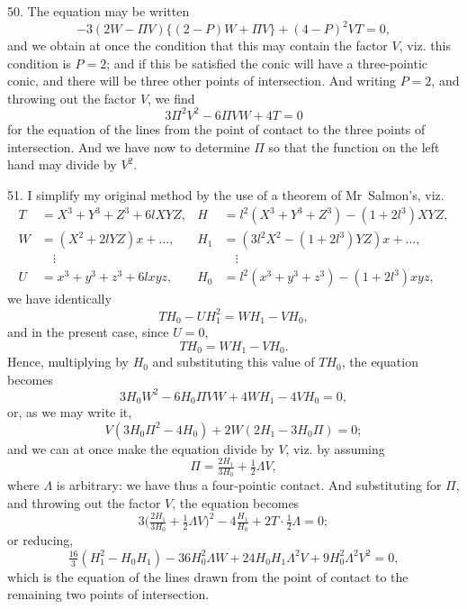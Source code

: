 \documentclass[11pt,a4paper]{article}
\theoremstyle{definition}
\begin{document}
50. The equation may be written
\[
-3(2W-\Pi V)\{(2-P)W+\Pi V\}+(4-P)^2VT=0,
\]
and we obtain at once the condition that this may contain the factor $V$, viz. this condition is $P=2$; and if this be satisfied the conic will have a three-pointic conic, and there will be three other points of intersection. And writing $P=2$, and throwing out the factor $V$, we find
\[
3\Pi^2V^2-6\Pi VW+4T=0
\]
for the equation of the lines from the point of contact to the three points of intersection. And we have now to determine $\Pi$ so that the function on the left hand may divide by $V^2$.

51. I simplify my original method by the use of a theorem of Mr~Salmon's, viz.
\begin{align*}
T &= X^3+Y^3+Z^3+6lXYZ, & H &= l^2(X^3+Y^3+Z^3)-(1+2l^3)XYZ,\\
W &= (X^2+2lYZ)x+\ldots, & H_1 &= (3l^2X^2-(1+2l^3)YZ)x+\ldots,\\
&\quad\vdots & &\quad\vdots\\
U &= x^3+y^3+z^3+6lxyz, & H_0 &= l^2(x^3+y^3+z^3)-(1+2l^3)xyz,
\end{align*}
we have identically
\[
TH_0-UH_1^2=WH_1-VH_0,
\]
and in the present case, since $U=0$,
\[
TH_0=WH_1-VH_0.
\]
Hence, multiplying by $H_0$ and substituting this value of $TH_0$, the equation becomes
\[
3H_0W^2-6H_0\Pi VW+4WH_1-4VH_0=0,
\]
or, as we may write it,
\[
V(3H_0\Pi^2-4H_0)+2W(2H_1-3H_0\Pi)=0;
\]
and we can at once make the equation divide by $V$, viz. by assuming
\[
\Pi=\tfrac{2H_1}{3H_0}+\tfrac{1}{2}\Lambda V,
\]
where $\Lambda$ is arbitrary: we have thus a four-pointic contact. And substituting for $\Pi$, and throwing out the factor $V$, the equation becomes
\[
3\bigl(\tfrac{2H_1}{3H_0}+\tfrac{1}{2}\Lambda V\bigr)^2-4\tfrac{H_1}{H_0}+2T\cdot\tfrac{1}{2}\Lambda=0;
\]
or reducing,
\[
\tfrac{16}{3}(H_1^2-H_0H_1)-36H_0^2\Lambda W+24H_0H_1\Lambda^2V+9H_0^2\Lambda^2V^2=0,
\]
which is the equation of the lines drawn from the point of contact to the remaining two points of intersection.
\end{document}
